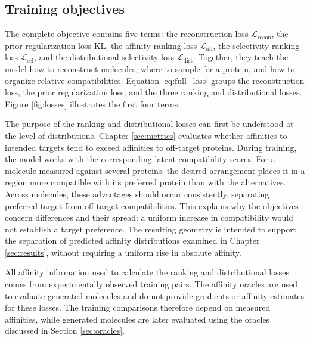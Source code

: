 \documentclass[a4paper,12pt]{article}
\begin{document}
\subsection{Training objectives}\label{sec:losses}
The complete objective contains five terms: the reconstruction loss $\mathcal{L}_{\mathrm{recon}}$, the prior regularization loss $\mathrm{KL}$, the affinity ranking loss $\mathcal{L}_{\mathrm{aff}}$, the selectivity ranking loss $\mathcal{L}_{\mathrm{sel}}$, and the distributional selectivity loss $\mathcal{L}_{\mathrm{dist}}$. Together, they teach the model how to reconstruct molecules, where to sample for a protein, and how to organize relative compatibilities. Equation \ref{eq:full_loss} groups the reconstruction loss, the prior regularization loss, and the three ranking and distributional losses. Figure \ref{fig:losses} illustrates the first four terms.

The purpose of the ranking and distributional losses can first be understood at the level of distributions. Chapter \ref{sec:metrics} evaluates whether affinities to intended targets tend to exceed affinities to off-target proteins. During training, the model works with the corresponding latent compatibility scores. For a molecule measured against several proteins, the desired arrangement places it in a region more compatible with its preferred protein than with the alternatives. Across molecules, these advantages should occur consistently, separating preferred-target from off-target compatibilities. This explains why the objectives concern differences and their spread: a uniform increase in compatibility would not establish a target preference. The resulting geometry is intended to support the separation of predicted affinity distributions examined in Chapter \ref{sec:results}, without requiring a uniform rise in absolute affinity.

All affinity information used to calculate the ranking and distributional losses comes from experimentally observed training pairs. The affinity oracles are used to evaluate generated molecules and do not provide gradients or affinity estimates for these losses. The training comparisons therefore depend on measured affinities, while generated molecules are later evaluated using the oracles discussed in Section \ref{sec:oracles}.
\end{document}
